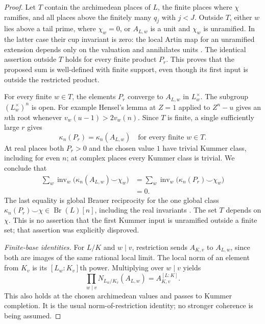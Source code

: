 \begin{proof}
Let $T$ contain the archimedean places of $L$, the finite
places where $\chi$ ramifies, and all places above the
finitely many $q_j$ with $j<J$. Outside $T$, either $w$
lies above a tail prime, where $\chi_w=0$, or $A_{L,w}$
is a unit and $\chi_w$ is unramified. In the latter case
their cup invariant is zero: the local Artin map for an
unramified extension depends only on the valuation and
annihilates units
\cite[Chapter III, Proposition 3.6 and Lemma 3.7,
pp.~109--110]{D_MilneCFT2020}.
The identical assertion outside $T$ holds for every finite
product $P_r$. This proves that the proposed sum is
well-defined with finite support, even though its first
input is outside the restricted product.

For every finite $w\in T$, the elements $P_r$ converge
to $A_{L,w}$ in $L_w^\times$. The subgroup
$(L_w^\times)^n$ is open. For example Hensel's lemma at
$Z=1$ applied to $Z^n-u$ gives an $n$th root whenever
$v_w(u-1)>2v_w(n)$. Since $T$ is finite, a single sufficiently
large $r$ gives
\[
 \kappa_n(P_r)=\kappa_n(A_{L,w})
                      \quad\text{for every finite }w\in T.
\]
At real places both $P_r>0$ and the chosen value $1$ have
trivial Kummer class, including for even $n$; at complex
places every Kummer class is trivial. We conclude that
\[
\begin{split}
 \sum_w\operatorname{inv}_w
       \bigl(\kappa_n(A_{L,w})\smile\chi_w\bigr)
 &=\sum_w\operatorname{inv}_w
       \bigl(\kappa_n(P_r)\smile\chi_w\bigr)\\
 &=0.
\end{split}
\]
The last equality is global Brauer reciprocity for the
one global class
$\kappa_n(P_r)\smile\chi\in\operatorname{Br}(L)[n]$,
including the real invariants
\cite[Chapter VIII, Theorem 4.2, p.~241]{D_MilneCFT2020}.
The set $T$ depends on $\chi$. This is no assertion that
the first Kummer input is unramified outside a finite set;
that assertion was explicitly disproved.

\emph{Finite-base identities.}
For $L/K$ and $w\mid v$, restriction sends $A_{K,v}$
to $A_{L,w}$, since both are images of the same rational
local limit. The local norm of an element from $K_v$ is
its $[L_w:K_v]$th power. Multiplying over $w\mid v$ yields
\[
 \prod_{w\mid v}N_{L_w/K_v}(A_{L,w})
                         =A_{K,v}^{[L:K]}.
\]
This also holds at the chosen archimedean values and
passes to Kummer completion. It is the usual
norm-of-restriction identity; no stronger coherence is
being assumed.


\end{proof}
